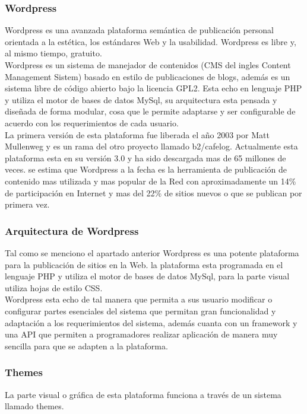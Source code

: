 \subsubsection{Wordpress}
Wordpress es una avanzada plataforma semántica de publicación personal orientada a la estética, los estándares Web y la usabilidad. Wordpress es libre y, al mismo tiempo, gratuito.\\
Wordpress es un sistema de manejador de contenidos (CMS del ingles Content Management Sistem) basado en estilo de publicaciones de blogs, además es un sistema libre de código abierto bajo la licencia GPL2. Esta echo en lenguaje PHP y utiliza el motor de bases de datos MySql, su arquitectura esta pensada y diseñada de forma modular, cosa que le permite adaptarse y ser configurable de acuerdo con los requerimientos de cada usuario.\\
La primera versión de esta plataforma fue liberada el año 2003 por Matt Mullenweg y es un rama del otro proyecto llamado b2/cafelog. Actualmente esta plataforma esta en su versión 3.0 y ha sido descargada mas de 65 millones de veces. se estima que Wordpress a la fecha es la herramienta de publicación de contenido mas utilizada y mas popular de la Red con aproximadamente un 14\% de participación en Internet y mas del 22\% de sitios nuevos o que se publican por primera vez.

\subsubsection{Arquitectura de Wordpress}
Tal como se menciono el apartado anterior Wordpress es una potente plataforma para la publicación de sitios en la Web. la plataforma esta programada en el lenguaje PHP y utiliza el motor de bases de datos MySql, para la parte visual utiliza hojas de estilo CSS.\\
Wordpress esta echo de tal manera que permita a sus usuario modificar o configurar partes esenciales del sistema que permitan gran funcionalidad y adaptación a los requerimientos del sistema, además cuanta con un framework y una API que permiten a programadores realizar aplicación de manera muy sencilla para que se adapten a la plataforma.

\subsubsection{Themes}
La parte visual o gráfica de esta plataforma funciona a través de un sistema llamado themes.\\

